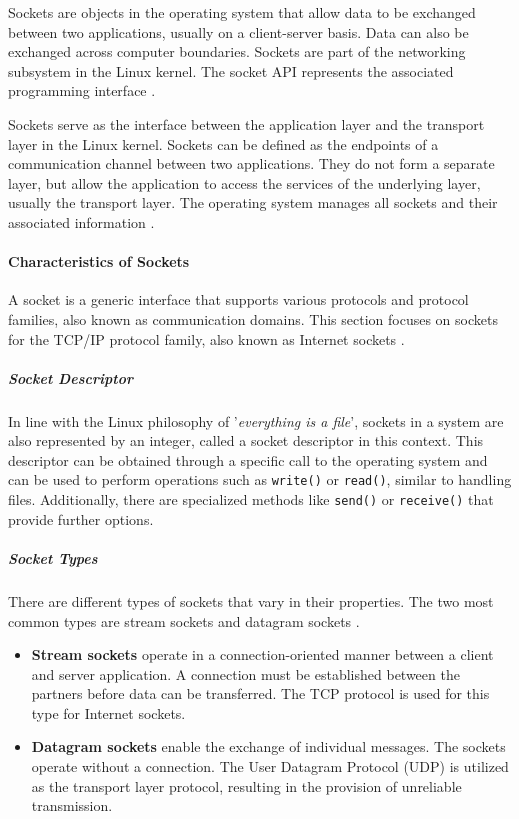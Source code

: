 Sockets are objects in the operating system that allow data to be exchanged between two applications, usually on a client-server basis. Data can also be exchanged across computer boundaries. Sockets are part of the networking subsystem in the Linux kernel. The socket API represents the associated programming interface \cite{sock01}\cite{sock11}.

Sockets serve as the interface between the application layer and the transport layer in the Linux kernel. Sockets can be defined as the endpoints of a communication channel between two applications. They do not form a separate layer, but allow the application to access the services of the underlying layer, usually the transport layer. The operating system manages all sockets and their associated information \cite{sock02}.

\paragraph{Characteristics of Sockets}

A socket is a generic interface that supports various protocols and protocol families, also known as communication domains. This section focuses on sockets for the TCP/IP protocol family, also known as Internet sockets \cite{like03}.

\subparagraph{Socket Descriptor}
In line with the Linux philosophy of '\textit{everything is a file}', sockets in a system are also represented by an integer, called a socket descriptor in this context. This descriptor can be obtained through a specific call to the operating system and can be used to perform operations such as \texttt{write()} or \texttt{read()}, similar to handling files. Additionally, there are specialized methods like \texttt{send()} or \texttt{receive()} that provide further options.

\subparagraph{Socket Types}
There are different types of sockets that vary in their properties. The two most common types are stream sockets and datagram sockets \cite{like03}.

\begin{itemize}
\item \textbf{Stream sockets} operate in a connection-oriented manner between a client and server application. A connection must be established between the partners before data can be transferred. The TCP protocol is used for this type for Internet sockets.
\item \textbf{Datagram sockets} enable the exchange of individual messages. The sockets operate without a connection. The User Datagram Protocol (UDP) is utilized as the transport layer protocol, resulting in the provision of unreliable transmission.
\end{itemize}

